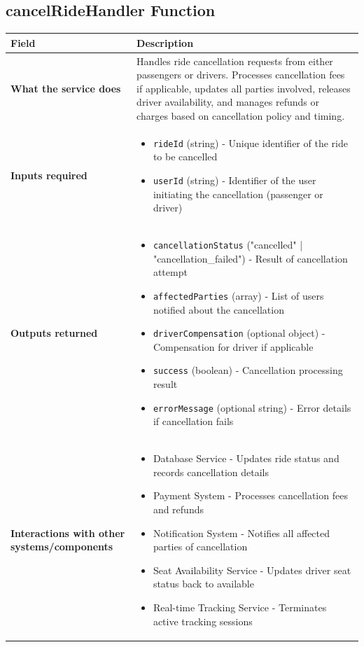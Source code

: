 \documentclass[11pt,a4paper]{article}
\begin{document}
\subsection{cancelRideHandler Function}

\begin{longtable}{|p{4cm}|p{12cm}|}
\hline
\textbf{Field} & \textbf{Description} \\
\hline
\textbf{What the service does} & 
Handles ride cancellation requests from either passengers or drivers. Processes cancellation fees if applicable, updates all parties involved, releases driver availability, and manages refunds or charges based on cancellation policy and timing. \\
\hline
\textbf{Inputs required} & 
\begin{itemize}[nosep]
\item \texttt{rideId} (string) - Unique identifier of the ride to be cancelled
\item \texttt{userId} (string) - Identifier of the user initiating the cancellation (passenger or driver)
\end{itemize} \\
\hline
\textbf{Outputs returned} & 
\begin{itemize}[nosep]
\item \texttt{cancellationStatus} ("cancelled" | "cancellation\_failed") - Result of cancellation attempt
\item \texttt{affectedParties} (array) - List of users notified about the cancellation
\item \texttt{driverCompensation} (optional object) - Compensation for driver if applicable
\item \texttt{success} (boolean) - Cancellation processing result
\item \texttt{errorMessage} (optional string) - Error details if cancellation fails
\end{itemize} \\
\hline
\textbf{Interactions with other systems/components} & 
\begin{itemize}[nosep]
\item Database Service - Updates ride status and records cancellation details
\item Payment System - Processes cancellation fees and refunds
\item Notification System - Notifies all affected parties of cancellation
\item Seat Availability Service - Updates driver seat status back to available
\item Real-time Tracking Service - Terminates active tracking sessions
\end{itemize} \\
\hline
\end{longtable}
\end{document}
